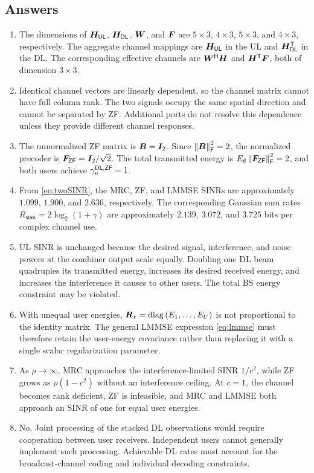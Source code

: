 \subsection*{Answers}
\begin{enumerate}[label=\textbf{E\arabic*.}]
	\item The dimensions of $\bm{H}_{\mathsf{UL}}$, $\bm{H}_{\mathsf{DL}}$, $\bm{W}$, and $\bm{F}$ are $5\times3$, $4\times3$, $5\times3$, and $4\times3$, respectively. The aggregate channel mappings are $\bm{H}_{\mathsf{UL}}$ in the UL and ${\bm{H}}^{\mathsf{T}}_{\mathsf{DL}}$ in the DL. The corresponding effective channels are ${\bm{W}}^{\mathsf{H}}\bm{H}$ and ${\bm{H}}^{\mathsf{T}}\bm{F}$, both of dimension $3\times3$.
	
	\item Identical channel vectors are linearly dependent, so the channel matrix cannot have full column rank. The two signals occupy the same spatial direction and cannot be separated by ZF. Additional ports do not resolve this dependence unless they provide different channel responses.
	
	\item The unnormalized ZF matrix is $\bm{B}=\bm{I}_2$. Since $\left\|\bm{B}\right\|_{\mathsf{F}}^2=2$, the normalized precoder is $\bm{F}_{\mathsf{ZF}}=\bm{I}_2/\sqrt{2}$. The total transmitted energy is $E_{\mathsf{d}}\left\|\bm{F}_{\mathsf{ZF}}\right\|_{\mathsf{F}}^2=2$, and both users achieve $\gamma_u^{\mathsf{DL},\mathsf{ZF}}=1$.
	
	\item From \eqref{eq:twoSINR}, the MRC, ZF, and LMMSE SINRs are approximately $1.099$, $1.900$, and $2.636$, respectively. The corresponding Gaussian sum rates $R_{\mathsf{sum}}=2\log_2(1+\gamma)$ are approximately $2.139$, $3.072$, and $3.725$ bits per complex channel use.
	
	\item UL SINR is unchanged because the desired signal, interference, and noise powers at the combiner output scale equally. Doubling one DL beam quadruples its transmitted energy, increases its desired received energy, and increases the interference it causes to other users. The total BS energy constraint may be violated.
	
	\item With unequal user energies, $\bm{R}_x=\operatorname{diag}\left(E_1,\ldots,E_U\right)$ is not proportional to the identity matrix. The general LMMSE expression \eqref{eq:lmmse} must therefore retain the user-energy covariance rather than replacing it with a single scalar regularization parameter.
	
	\item As $\rho\to\infty$, MRC approaches the interference-limited SINR $1/c^2$, while ZF grows as $\rho(1-c^2)$ without an interference ceiling. At $c=1$, the channel becomes rank deficient, ZF is infeasible, and MRC and LMMSE both approach an SINR of one for equal user energies.
	
	\item No. Joint processing of the stacked DL observations would require cooperation between user receivers. Independent users cannot generally implement such processing. Achievable DL rates must account for the broadcast-channel coding and individual decoding constraints.
\end{enumerate}



